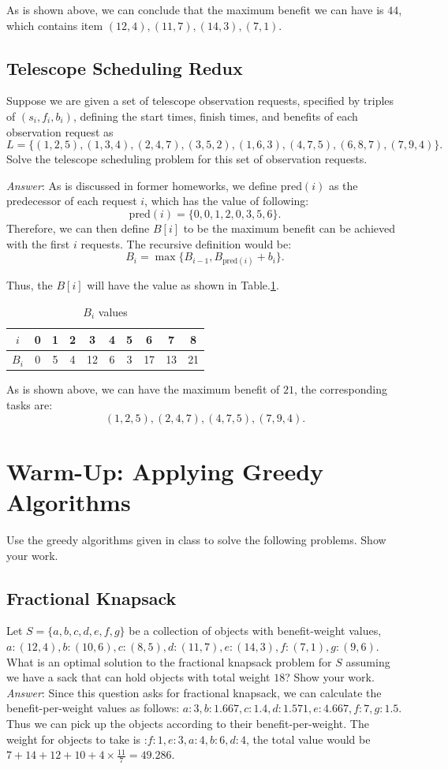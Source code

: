 \documentclass[11pt]{article}
\begin{document}
As is shown above, we can conclude that the maximum benefit we can have is $44$, which contains item $(12,4), (11,7), (14,3), (7,1)$.
\subsection{Telescope Scheduling Redux}
Suppose we are given a set of telescope observation requests, specified by triples of $(s_i,f_i,b_i)$, defining the start times, finish times, and benefits of each observation request as $$L=\{(1, 2, 5), (1, 3, 4), (2, 4, 7), (3, 5, 2), (1, 6, 3), (4, 7, 5), (6, 8, 7), (7, 9, 4)\}.$$
Solve the telescope scheduling problem for this set of observation requests.

\noindent \emph{Answer}: As is discussed in former homeworks, we define $\text{pred}(i)$ as the predecessor of each request $i$, which has the value of following:$$\text{pred}(i)=\{0,0,1,2,0,3,5,6\}.$$
Therefore, we can then define $B[i]$ to be the maximum benefit can be achieved with the first $i$ requests. The recursive definition would be: $$B_i=\max\{B_{i-1},B_{\text{pred}(i)}+b_i\}.$$

Thus, the $B[i]$ will have the value as shown in Table.\ref{tab:tab3}.
	\begin{table}[!hbp]
	\centering
	\tiny
	\caption{$B_i$ values}
	\begin{tabular}{c|c|c|c|c|c|c|c|c|c}
		\hline 
		\hline
		$i$  &0	&1	&2	&3	&4	&5	&6	&7	&8\\
		\hline
		$B_i$&0	&5	&4	&12	&6	&3	&17	&13	&21\\
		\hline
		\hline
	\end{tabular}
	\label{tab:tab3}
\end{table}

As is shown above, we can have the maximum benefit of $21$, the corresponding tasks are: $$(1,2,5), (2,4,7),(4,7,5),(7,9,4).$$
\section{Warm-Up: Applying Greedy Algorithms}
Use the greedy algorithms given in class to solve the following problems. Show your work.
\subsection{Fractional Knapsack}
Let $S=\{a,b,c,d,e,f,g\}$ be a collection of objects with benefit-weight values, $a:(12,4),b:(10,6),c:(8,5),d:(11,7),e:(14,3),f:(7,1),g:(9,6)$. What is an optimal solution to the fractional knapsack problem for $S$ assuming we have a sack that can hold objects with total weight $18$? Show your work.
\noindent \emph{Answer}: Since this question asks for fractional knapsack, we can calculate the benefit-per-weight values as follows: $a:3, b:1.667,c:1.4,d:1.571,e:4.667,f:7,g:1.5$. Thus we can pick up the objects according to their benefit-per-weight. The weight for objects to take is :$f:1,e:3,a:4,b:6,d:4$, the total value would be $7+14+12+10+4\times \frac{11}{7}=49.286$.
\end{document}

